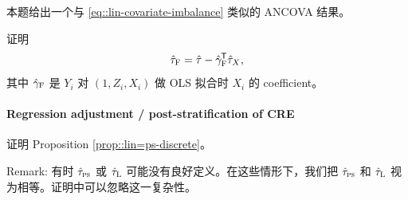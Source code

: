 本题给出一个与 \eqref{eq::lin-covariate-imbalance} 类似的 ANCOVA 结果。

证明
$$
\hat{\tau}_\textsc{F} =\hat\tau  - \hat\gamma_\textsc{F}^{\mkern-1.5mu\mathsf{T}} \hat\tau_X,
$$
其中 $ \hat\gamma_\textsc{F}$ 是 $Y_i$ 对 $(1,Z_i, X_i)$ 做 OLS 拟合时 $X_i$ 的 coefficient。

 \paragraph{Regression adjustment / post-stratification of CRE}\label{para::lin=ps-discrete}
 
 证明 Proposition \ref{prop::lin=ps-discrete}。
 
Remark: 有时 $\hat{\tau}_{\textsc{ps}}$ 或 $ \hat{\tau}_\textsc{L}$ 可能没有良好定义。在这些情形下，我们把 $\hat{\tau}_{\textsc{ps}}$ 和 $ \hat{\tau}_\textsc{L}$ 视为相等。证明中可以忽略这一复杂性。
 
%
%
%

%
%
%
%
%
%

